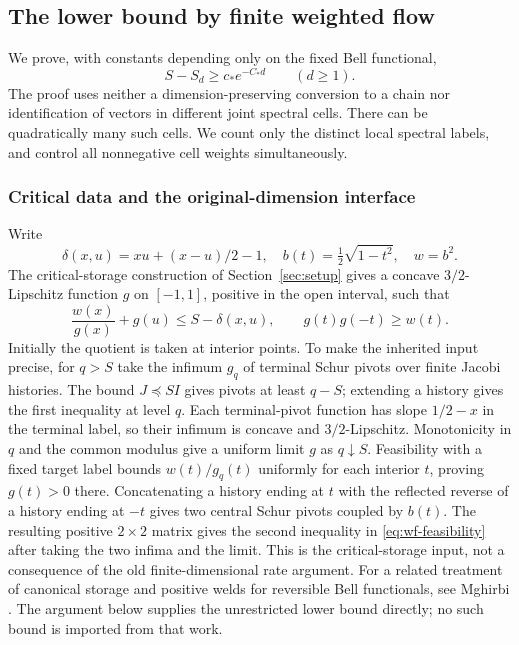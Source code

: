 \subsection{The lower bound by finite weighted flow}\label{sec:rate-lower}

We prove, with constants depending only on the fixed Bell functional,
\begin{equation}\label{eq:lb}
 S-S_d\ge c_* e^{-C_*d}\qquad(d\ge1).
\end{equation}
The proof uses neither a dimension-preserving conversion to a chain nor
identification of vectors in different joint spectral cells. There can be
quadratically many such cells. We count only the distinct local spectral
labels, and control all nonnegative cell weights simultaneously.

\subsubsection*{Critical data and the original-dimension interface}

Write
\[
 \delta(x,u)=xu+(x-u)/2-1,\quad b(t)=\tfrac12\sqrt{1-t^2},
 \quad w=b^2.
\]
The critical-storage construction of Section~\ref{sec:setup} gives a
concave $3/2$-Lipschitz function $g$ on $[-1,1]$, positive in the open
interval, such that
\begin{equation}\label{eq:wf-feasibility}
 \frac{w(x)}{g(x)}+g(u)\le S-\delta(x,u),\qquad
 g(t)g(-t)\ge w(t).
\end{equation}
Initially the quotient is taken at interior points. To make the inherited
input precise, for $q>S$ take the infimum $g_q$ of terminal Schur pivots
over finite Jacobi histories. The bound $J\preceq SI$ gives pivots at least
$q-S$; extending a history gives the first inequality at level $q$.
Each terminal-pivot function has slope $1/2-x$ in the terminal label, so
their infimum is concave and $3/2$-Lipschitz. Monotonicity in $q$ and the
common modulus give a uniform limit $g$ as $q\downarrow S$.
Feasibility with a fixed target label bounds $w(t)/g_q(t)$ uniformly for
each interior $t$, proving $g(t)>0$ there. Concatenating a history ending
at $t$ with the reflected reverse of a history ending at $-t$ gives two
central Schur pivots coupled by $b(t)$. The resulting positive
$2\times2$ matrix gives the second inequality in
\eqref{eq:wf-feasibility} after taking the two infima and the limit.
This is the critical-storage input, not a consequence of the old
finite-dimensional rate argument.
For a related treatment of canonical storage and positive welds for
reversible Bell functionals, see Mghirbi \cite{MghirbiDynamics}.
The argument below supplies the unrestricted lower bound directly;
no such bound is imported from that work.

